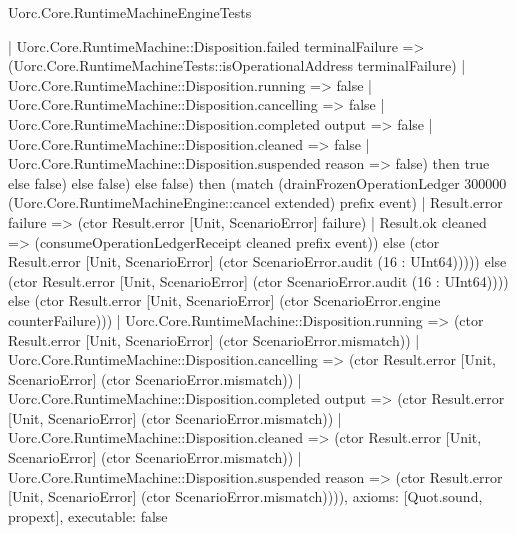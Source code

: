 \begin{lexlean}{Uorc.Core.RuntimeMachineEngineTests}
\begin{semanticmodule}
{        | Uorc.Core.RuntimeMachine::Disposition.failed terminalFailure => (Uorc.Core.RuntimeMachineTests::isOperationalAddress terminalFailure)
        | Uorc.Core.RuntimeMachine::Disposition.running => false
        | Uorc.Core.RuntimeMachine::Disposition.cancelling => false
        | Uorc.Core.RuntimeMachine::Disposition.completed output => false
        | Uorc.Core.RuntimeMachine::Disposition.cleaned => false
        | Uorc.Core.RuntimeMachine::Disposition.suspended reason => false) then true else false) else false) else false) then (match (drainFrozenOperationLedger 300000 (Uorc.Core.RuntimeMachineEngine::cancel extended) prefix event)
        | Result.error failure => (ctor Result.error [Unit, ScenarioError] failure)
        | Result.ok cleaned => (consumeOperationLedgerReceipt cleaned prefix event)) else (ctor Result.error [Unit, ScenarioError] (ctor ScenarioError.audit (16 : UInt64))))) else (ctor Result.error [Unit, ScenarioError] (ctor ScenarioError.audit (16 : UInt64)))) else (ctor Result.error [Unit, ScenarioError] (ctor ScenarioError.engine counterFailure)))
      | Uorc.Core.RuntimeMachine::Disposition.running => (ctor Result.error [Unit, ScenarioError] (ctor ScenarioError.mismatch))
      | Uorc.Core.RuntimeMachine::Disposition.cancelling => (ctor Result.error [Unit, ScenarioError] (ctor ScenarioError.mismatch))
      | Uorc.Core.RuntimeMachine::Disposition.completed output => (ctor Result.error [Unit, ScenarioError] (ctor ScenarioError.mismatch))
      | Uorc.Core.RuntimeMachine::Disposition.cleaned => (ctor Result.error [Unit, ScenarioError] (ctor ScenarioError.mismatch))
      | Uorc.Core.RuntimeMachine::Disposition.suspended reason => (ctor Result.error [Unit, ScenarioError] (ctor ScenarioError.mismatch)))),
  axioms: [Quot.sound, propext],
  executable: false
}


\end{semanticmodule}
\end{lexlean}
